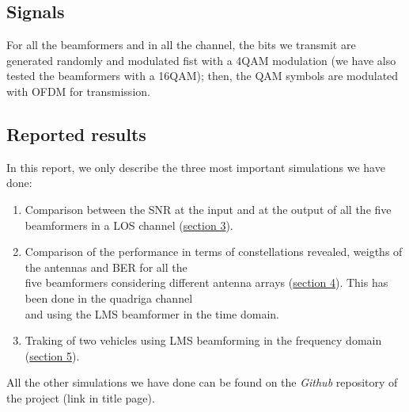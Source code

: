 \subsection{Signals}

For all the beamformers and in all the channel, the bits we transmit are generated randomly and modulated fist with a 4\-QAM 
modulation (we have also tested the beamformers with a 16\-QAM); then, the QAM symbols are modulated with OFDM for transmission.

\subsection{Reported results}

In this report, we only describe the three most important simulations we have done:

\begin{enumerate}
    \item Comparison between the SNR at the input and at the output of all the five beamformers in a LOS channel (\hyperref[sec:snr_comparison]{section 3}).
    \item Comparison of the performance in terms of constellations revealed, weigths of the antennas and BER for all the \\ 
            five beamformers considering different antenna arrays (\hyperref[sec:antenna_array_comparison]{section 4}). This has been done in the quadriga channel \\ 
            and using the LMS beamformer in the time domain.
    \item Traking of two vehicles using LMS beamforming in the frequency domain (\hyperref[sec:tracking]{section 5}).
\end{enumerate}

All the other simulations we have done can be found on the \textit{Github} repository of the project (link in title page).